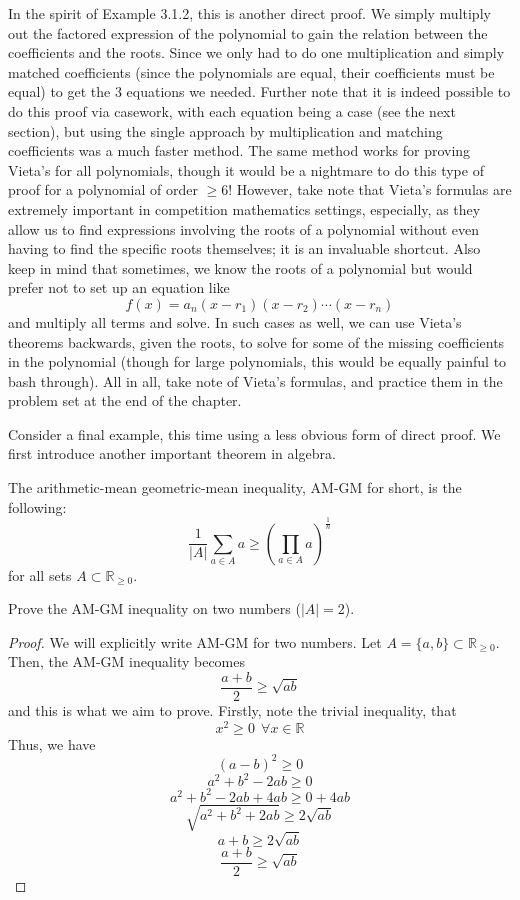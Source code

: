 In the spirit of Example 3.1.2, this is another direct proof. We simply multiply out the factored expression of the polynomial to gain the relation between the coefficients and the roots. Since we only had to do one multiplication and simply matched coefficients (since the polynomials are equal, their coefficients must be equal) to get the 3 equations we needed. Further note that it is indeed possible to do this proof via casework, with each equation being a case (see the next section), but using the single approach by multiplication and matching coefficients was a much faster method. The same method works for proving Vieta's for all polynomials, though it would be a nightmare to do this type of proof for a polynomial of order $\geq 6$! However, take note that Vieta's formulas are extremely important in competition mathematics settings, especially, as they allow us to find expressions involving the roots of a polynomial without even having to find the specific roots themselves; it is an invaluable shortcut. Also keep in mind that sometimes, we know the roots of a polynomial but would prefer not to set up an equation like 
\[
f(x) = a_n(x-r_1)(x-r_2)\cdots(x-r_n)
\]
and multiply all terms and solve. In such cases as well, we can use Vieta's theorems backwards, given the roots, to solve for some of the missing coefficients in the polynomial (though for large polynomials, this would be equally painful to bash through). All in all, take note of Vieta's formulas, and practice them in the problem set at the end of the chapter.

Consider a final example, this time using a less obvious form of direct proof. We first introduce another important theorem in algebra. 

\begin{theorem} 
    The arithmetic-mean geometric-mean inequality, AM-GM for short, is the following:
    \[
    \frac{1}{|A|} \sum_{a \in A} a \geq \left(\prod_{a \in A} {a}\right)^{\frac{1}{n}}
    \]
    for all sets $A \subset \mathbb{R}_{\geq 0}$. 
\end{theorem}

\begin{example}
    Prove the AM-GM inequality on two numbers ($|A| = 2$).
\end{example}
\begin{proof}
    We will explicitly write AM-GM for two numbers. Let $A = \{ a, b\} \subset \mathbb{R}_{\geq 0}$. Then, the AM-GM inequality becomes
    \[
    \frac{a + b}{2} \geq \sqrt{ab}
    \]
    and this is what we aim to prove. Firstly, note the trivial inequality, that 
    \[
    x^2 \geq 0 ~~ \forall x \in \mathbb{R}
    \]
    Thus, we have
    \[
    (a - b)^2 \geq 0
    \]
    \[
    a^2 + b^2 - 2ab \geq 0
    \]
    \begin{equation}
    a^2 + b^2 - 2ab + 4ab \geq 0 + 4ab
    \end{equation}
    \[
    \sqrt{a^2 + b^2 + 2ab} \geq 2\sqrt{ab}
    \]
    \[
    a+b \geq 2\sqrt{ab}
    \]
    \[
    \frac{a + b}{2} \geq \sqrt{ab}
    \]
\end{proof}

